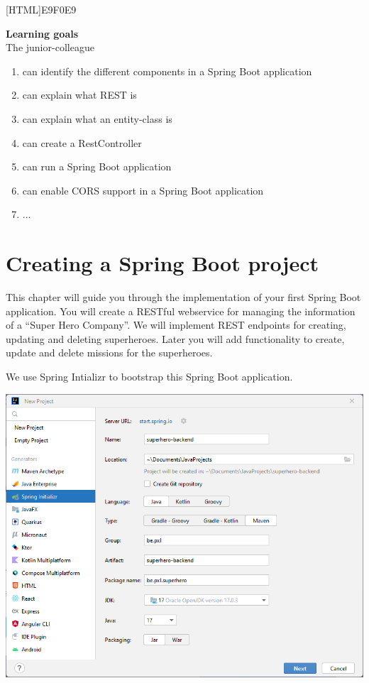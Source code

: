 \documentclass[a4paper, 12pt]{report}
\begin{document}
 [HTML]{E9F0E9}{\parbox{\textwidth}{%
\noindent \textbf{Learning goals}\\
The junior-colleague
\begin{enumerate}[nolistsep]
\item can identify the different components in a Spring Boot application
\item can explain what REST is
\item can explain what an entity-class is
\item can create a RestController
\item can run a Spring Boot application
\item can enable CORS support in a Spring Boot application
\item ...
\end{enumerate}}}


\section{Creating a Spring Boot project}

This chapter will guide you through the implementation of your first Spring Boot application. You will create a RESTful webservice for managing the information of a ``Super Hero Company''. We will implement REST endpoints for creating, updating and deleting superheroes. Later you will add functionality to create, update and delete missions for the superheroes.

We use Spring Intializr to bootstrap this Spring Boot application. 

\includegraphics[width=\textwidth]{./images/chapter2/new_project.png} 
\end{document}
